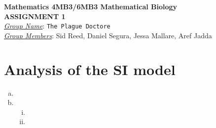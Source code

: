 \documentclass[12pt]{article}
\begin{document}
\begin{center}
{\bfseries Mathematics 4MB3/6MB3 Mathematical Biology\\
 ASSIGNMENT {\color{blue}1}}\\
\medskip
\underline{\emph{Group Name}}: \texttt{{\color{blue}The Plague Doctore}}\\
\medskip
\underline{\emph{Group Members}}: {\color{blue}Sid Reed, Daniel Segura, Jessa Mallare, Aref Jadda}
\end{center}
\section{Analysis of the SI model}
\SIanalIntro
\begin{enumerate}[(a)]
\item
\item
  \begin{enumerate}[(i)]
  \item
  \item
  \end{enumerate}
\end{enumerate}
\end{document}
